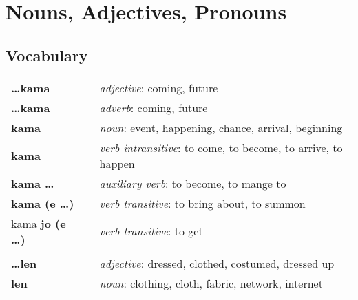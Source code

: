 \section{Nouns, Adjectives, Pronouns}
%
\subsection*{Vocabulary}
\begin{supertabular}{p{2,5cm}|ll}
    \textbf{\dots kama}        &  & \textit{adjective}: coming, future                                                      \\ %
    \textbf{\dots kama}        &  & \textit{adverb}: coming, future                                                         \\ %
    \textbf{kama}              &  & \textit{noun}: event, happening, chance, arrival, beginning                             \\ %
    \textbf{kama}              &  & \textit{verb intransitive}: to come, to become, to arrive, to happen                    \\ %
    \textbf{kama \dots}        &  & \textit{auxiliary verb}: to become, to mange to                                         \\ %
    \textbf{kama (e \dots)}    &  & \textit{verb transitive}: to bring about, to summon                                     \\ %
    kama \textbf{jo (e \dots)} &  & \textit{verb transitive}: to get                                                        \\ %
                               &  &                                                                                         \\ %
    \textbf{\dots len}         &  & \textit{adjective}: dressed, clothed, costumed, dressed up                              \\ %
    \textbf{len}               &  & \textit{noun}: clothing, cloth, fabric, network, internet                               \\ %

\end{supertabular}
